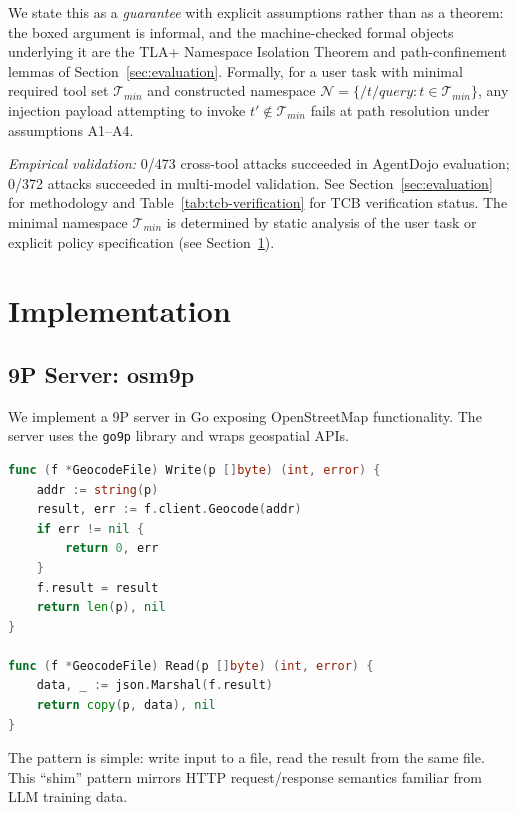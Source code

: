 \documentclass[acmsmall,screen,review]{acmart}
\begin{document}
\noindent We state this as a \textit{guarantee} with explicit assumptions rather than as a theorem: the boxed argument is informal, and the machine-checked formal objects underlying it are the TLA+ Namespace Isolation Theorem and path-confinement lemmas of Section~\ref{sec:evaluation}. Formally, for a user task with minimal required tool set $\mathcal{T}_{min}$ and constructed namespace $\mathcal{N} = \{/t/query : t \in \mathcal{T}_{min}\}$, any injection payload attempting to invoke $t' \notin \mathcal{T}_{min}$ fails at path resolution under assumptions A1--A4.

\noindent\textit{Empirical validation:} 0/473 cross-tool attacks succeeded in AgentDojo evaluation; 0/372 attacks succeeded in multi-model validation. See Section~\ref{sec:evaluation} for methodology and Table~\ref{tab:tcb-verification} for TCB verification status. The minimal namespace $\mathcal{T}_{min}$ is determined by static analysis of the user task or explicit policy specification (see Section~\ref{sec:implementation}).

\section{Implementation}
\label{sec:implementation}

\subsection{9P Server: osm9p}

We implement a 9P server in Go exposing OpenStreetMap functionality. The server uses the \texttt{go9p} library and wraps geospatial APIs.

\begin{lstlisting}[language=Go,caption={9P file handler for geocoding}]
func (f *GeocodeFile) Write(p []byte) (int, error) {
    addr := string(p)
    result, err := f.client.Geocode(addr)
    if err != nil {
        return 0, err
    }
    f.result = result
    return len(p), nil
}

func (f *GeocodeFile) Read(p []byte) (int, error) {
    data, _ := json.Marshal(f.result)
    return copy(p, data), nil
}
\end{lstlisting}

The pattern is simple: write input to a file, read the result from the same file. This ``shim'' pattern mirrors HTTP request/response semantics familiar from LLM training data.
\end{document}
